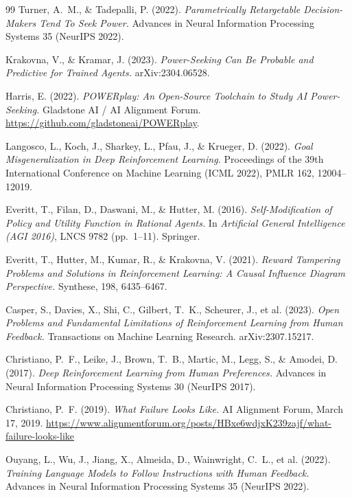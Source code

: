 \documentclass[11pt]{article}
\theoremstyle{definition}
\begin{document}
\begin{thebibliography}{99}
Turner, A.~M., \& Tadepalli, P. (2022). \emph{Parametrically Retargetable Decision-Makers Tend To Seek Power.} Advances in Neural Information Processing Systems 35 (NeurIPS 2022).

Krakovna, V., \& Kramar, J. (2023). \emph{Power-Seeking Can Be Probable and Predictive for Trained Agents.} arXiv:2304.06528.

Harris, E. (2022). \emph{POWERplay: An Open-Source Toolchain to Study AI Power-Seeking.} Gladstone AI / AI Alignment Forum. \url{https://github.com/gladstoneai/POWERplay}.

Langosco, L., Koch, J., Sharkey, L., Pfau, J., \& Krueger, D. (2022). \emph{Goal Misgeneralization in Deep Reinforcement Learning.} Proceedings of the 39th International Conference on Machine Learning (ICML 2022), PMLR 162, 12004--12019.

Everitt, T., Filan, D., Daswani, M., \& Hutter, M. (2016). \emph{Self-Modification of Policy and Utility Function in Rational Agents.} In \emph{Artificial General Intelligence (AGI 2016)}, LNCS 9782 (pp.~1--11). Springer.

Everitt, T., Hutter, M., Kumar, R., \& Krakovna, V. (2021). \emph{Reward Tampering Problems and Solutions in Reinforcement Learning: A Causal Influence Diagram Perspective.} Synthese, 198, 6435--6467.

Casper, S., Davies, X., Shi, C., Gilbert, T.~K., Scheurer, J., et al. (2023). \emph{Open Problems and Fundamental Limitations of Reinforcement Learning from Human Feedback.} Transactions on Machine Learning Research. arXiv:2307.15217.

Christiano, P.~F., Leike, J., Brown, T.~B., Martic, M., Legg, S., \& Amodei, D. (2017). \emph{Deep Reinforcement Learning from Human Preferences.} Advances in Neural Information Processing Systems 30 (NeurIPS 2017).

Christiano, P.~F. (2019). \emph{What Failure Looks Like.} AI Alignment Forum, March 17, 2019. \url{https://www.alignmentforum.org/posts/HBxe6wdjxK239zajf/what-failure-looks-like}

Ouyang, L., Wu, J., Jiang, X., Almeida, D., Wainwright, C.~L., et al. (2022). \emph{Training Language Models to Follow Instructions with Human Feedback.} Advances in Neural Information Processing Systems 35 (NeurIPS 2022).


\end{thebibliography}
\end{document}
